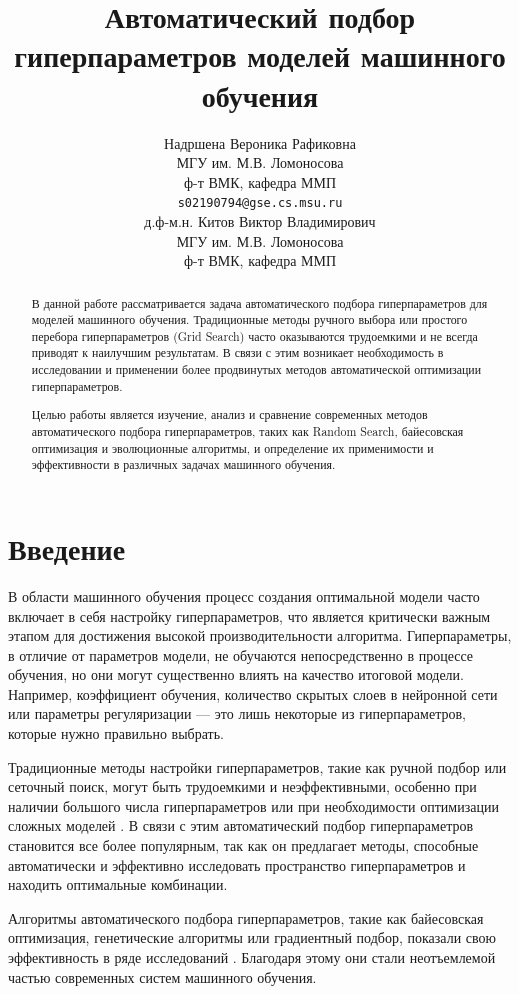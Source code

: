 \documentclass{article}
\title{Автоматический подбор гиперпараметров моделей машинного обучения}
\author{ Надршена Вероника Рафиковна  \\
	МГУ им. М.В. Ломоносова\\
	ф-т ВМК, кафедра ММП\\
	\texttt{s02190794@gse.cs.msu.ru} \\
	\And
	д.ф-м.н. Китов Виктор Владимирович\\
	МГУ им. М.В. Ломоносова\\
	ф-т ВМК, кафедра ММП\\
}
\date{}
\begin{document}
\maketitle

\begin{abstract}
	В данной работе рассматривается задача автоматического подбора гиперпараметров для моделей машинного обучения. Традиционные методы ручного выбора или простого перебора гиперпараметров (Grid Search) часто оказываются трудоемкими и не всегда приводят к наилучшим результатам. В связи с этим возникает необходимость в исследовании и применении более продвинутых методов автоматической оптимизации гиперпараметров.

    Целью работы является изучение, анализ и сравнение современных методов автоматического подбора гиперпараметров, таких как Random Search, байесовская оптимизация и эволюционные алгоритмы, и определение их применимости и эффективности в различных задачах машинного обучения.
\end{abstract}



\section{Введение}
В области машинного обучения процесс создания оптимальной модели часто включает в себя настройку гиперпараметров, что является критически важным этапом для достижения высокой производительности алгоритма. Гиперпараметры, в отличие от параметров модели, не обучаются непосредственно в процессе обучения, но они могут существенно влиять на качество итоговой модели. Например, коэффициент обучения, количество скрытых слоев в нейронной сети или параметры регуляризации — это лишь некоторые из гиперпараметров, которые нужно правильно выбрать.

Традиционные методы настройки гиперпараметров, такие как ручной подбор или сеточный поиск, могут быть трудоемкими и неэффективными, особенно при наличии большого числа гиперпараметров или при необходимости оптимизации сложных моделей \citep{bergstra2012}. В связи с этим автоматический подбор гиперпараметров становится все более популярным, так как он предлагает методы, способные автоматически и эффективно исследовать пространство гиперпараметров и находить оптимальные комбинации.

Алгоритмы автоматического подбора гиперпараметров, такие как байесовская оптимизация, генетические алгоритмы или градиентный подбор, показали свою эффективность в ряде исследований \citep{snoek2012, thornton2013}. Благодаря этому они стали неотъемлемой частью современных систем машинного обучения.
\end{document}
